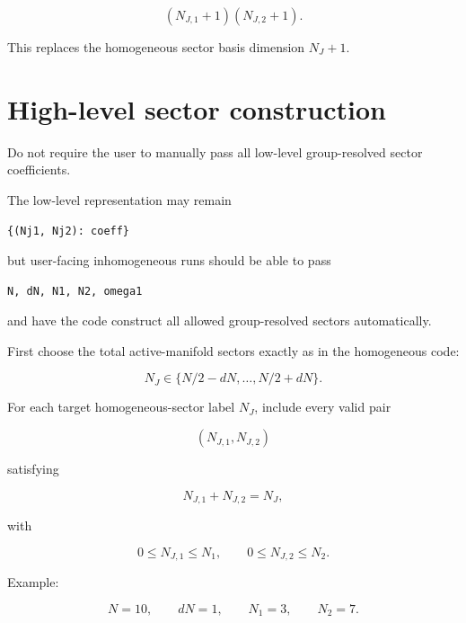 \documentclass[11pt]{article}
\begin{document}
\begin{equation}
(N_{J,1}+1)(N_{J,2}+1).
\end{equation}

This replaces the homogeneous sector basis dimension \(N_J+1\).

\section*{High-level sector construction}

Do not require the user to manually pass all low-level group-resolved sector
coefficients.

The low-level representation may remain

\begin{verbatim}
{(Nj1, Nj2): coeff}
\end{verbatim}

but user-facing inhomogeneous runs should be able to pass

\begin{verbatim}
N, dN, N1, N2, omega1
\end{verbatim}

and have the code construct all allowed group-resolved sectors automatically.

First choose the total active-manifold sectors exactly as in the homogeneous
code:

\begin{equation}
N_J\in\{N/2-dN,\dots,N/2+dN\}.
\end{equation}

For each target homogeneous-sector label \(N_J\), include every valid pair

\begin{equation}
(N_{J,1},N_{J,2})
\end{equation}

satisfying

\begin{equation}
N_{J,1}+N_{J,2}=N_J,
\end{equation}

with

\begin{equation}
0\leq N_{J,1}\leq N_1,
\qquad
0\leq N_{J,2}\leq N_2.
\end{equation}

Example:

\begin{equation}
N=10,
\qquad
dN=1,
\qquad
N_1=3,
\qquad
N_2=7.
\end{equation}
\end{document}
